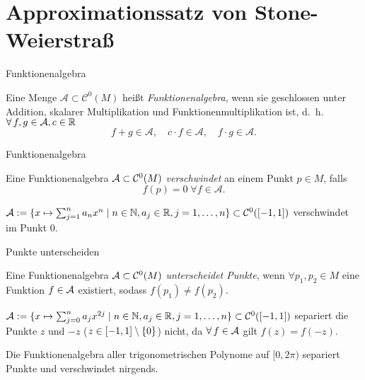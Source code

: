 \section{Approximationssatz von Stone-Weierstraß}

\begin{frame}{Funktionenalgebra}
    \begin{defi*}[Funktionenalgebra]
        Eine Menge \( \mathcal{A} \subset \mathcal{C}^0(M) \) heißt 
        \textit{Funktionenalgebra}, wenn sie geschlossen unter Addition, 
        skalarer Multiplikation und Funktionenmultiplikation ist, 
        d.~h. \( \forall f,g \in \A, c \in \mathbb{R} \)
        \[ f + g \in \mathcal{A}, \quad c \cdot f \in \mathcal{A}, \quad f \cdot g \in \mathcal{A}. \]
    \end{defi*}
\end{frame}

\begin{frame}{Funktionenalgebra}
    \begin{defi*}[Verschwinden]
        Eine Funktionenalgebra \(\mathcal{A} \subset \mathcal{C}^0(M)\) 
        \textit{verschwindet} an einem Punkt \(p \in M\), falls 
        \[ f(p) = 0 \;\forall f \in \mathcal{A}. \]
    \end{defi*}
    \pause
    \begin{bsp}
        \( \mathcal{A} := \{ x \mapsto \sum_{j=1}^n a_n x^n \;|\; n\in \mathbb{N}, a_j \in \mathbb{R}, j = 1,\ldots, n \} \subset \mathcal{C}^0([-1,1]) \) 
        verschwindet im Punkt \(0\).
    \end{bsp}
\end{frame}

\begin{frame}{Punkte unterscheiden}
    \begin{defi*}
        Eine Funktionenalgebra \(\mathcal{A} \subset \mathcal{C}^0(M)\) \textit{unterscheidet Punkte}, 
        wenn \( \forall p_1, p_2 \in M \) eine Funktion \(f \in \mathcal{A}\) existiert, 
        sodass \( f(p_1) \neq f(p_2) \).
    \end{defi*}
    \pause
    \begin{bsp}
        \( \mathcal{A} := \{ x \mapsto \sum_{j=0}^n a_{j} x^{2j} \;|\; n\in\mathbb{N}, a_j \in \mathbb{R}, j = 1,\ldots, n \} 
        \subset \mathcal{C}^0([-1,1]) \)
        separiert die Punkte \( z \) und \(-z\) (\(z \in [-1,1] \setminus \{0\} \)) nicht, da \( \forall f \in \A \) gilt 
        \( f(z) = f(-z) \).
    \end{bsp}
    \pause
    \begin{bsp}
        Die Funktionenalgebra aller trigonometrischen Polynome auf \( [0,2\pi) \) 
        separiert Punkte und verschwindet nirgends.
    \end{bsp}
\end{frame}

